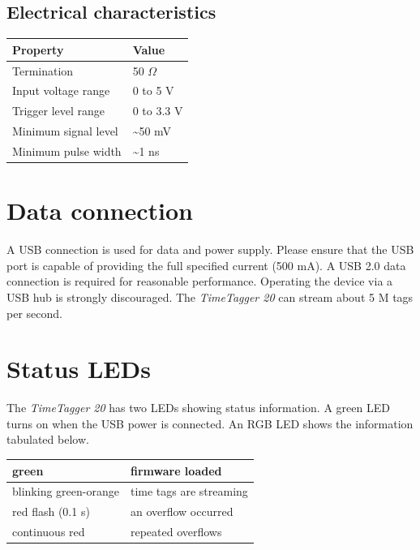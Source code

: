 \documentclass[letterpaper,10pt,english]{sphinxmanual}
\begin{document}
\subsection{Electrical characteristics}
\label{sections/hardware:electrical-characteristics}
\begin{tabulary}{\linewidth}{|L|L|}
\hline
\textsf{\relax 
Property
} & \textsf{\relax 
Value
}\\
\hline
Termination
 & 
50  \(\Omega\)
\\
\hline
Input voltage range
 & 
0 to 5 V
\\
\hline
Trigger level range
 & 
0 to 3.3 V
\\
\hline
Minimum signal level
 & 
\textasciitilde{}50 mV
\\
\hline
Minimum pulse width
 & 
\textasciitilde{}1 ns
\\
\hline\end{tabulary}



\section{Data connection}
\label{sections/hardware:data-connection}
A USB connection is used for data and power supply. Please ensure that the USB port is capable of providing the full
specified current (500 mA). A USB 2.0 data connection is required for reasonable performance. Operating the device via
a USB hub is strongly discouraged. The \emph{TimeTagger 20} can stream about 5 M tags per second.


\section{Status LEDs}
\label{sections/hardware:status-leds}
The \emph{TimeTagger 20} has two LEDs showing status information. A green LED turns on when the USB power is connected.
An RGB LED shows the information tabulated below.

\begin{tabulary}{\linewidth}{|L|L|}
\hline

green
 & 
firmware loaded
\\
\hline
blinking green-orange
 & 
time tags are streaming
\\
\hline
red flash (0.1 s)
 & 
an overflow occurred
\\
\hline
continuous red
 & 
repeated overflows
\\
\hline\end{tabulary}
\end{document}
